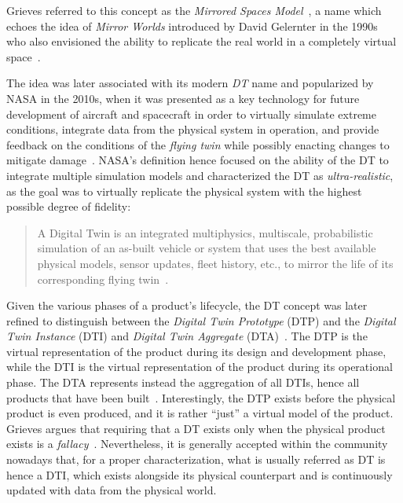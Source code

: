 Grieves referred to this concept as the \emph{Mirrored Spaces Model}~\cite{Grieves_2005},
a name which echoes the idea of \emph{Mirror Worlds} introduced by David Gelernter in the 1990s~\cite{gelernter1991mirrorworlds}
who also envisioned the ability to replicate the real world in a completely virtual space~\cite{Singh_Fuenmayor_Hinchy_Qiao_Murray_Devine_2021}.

The idea was later associated with its modern \emph{\acl{DT}} name and popularized by NASA in the 2010s, when it was presented as a key technology
for future development of aircraft and spacecraft in order to virtually simulate extreme conditions,
integrate data from the physical system in operation, 
and provide feedback on the conditions of the \emph{flying twin}
while possibly enacting changes to mitigate damage~\cite{glaessgen2012dtnasa}.
%
NASA's definition hence focused on the ability of the \ac{DT} to integrate multiple simulation models and characterized the \ac{DT} as \emph{ultra-realistic}, as the goal was to virtually replicate the physical system with the highest possible degree of fidelity:

\begin{quote}
    A Digital Twin is an integrated multiphysics, multiscale, probabilistic simulation of an as-built vehicle or system that uses the best available physical models, sensor updates, fleet history, etc., to mirror the life of its corresponding flying twin~\cite{glaessgen2012dtnasa}.
\end{quote}

Given the various phases of a product's lifecycle, the \ac{DT} concept was later
refined to distinguish between the \emph{Digital Twin Prototype} (DTP) and the \emph{Digital Twin Instance} (DTI) and \emph{Digital Twin Aggregate} (DTA)~\cite{Grieves2017}.
The DTP is the virtual representation of the product during its design and development phase,
while the DTI is the virtual representation of the product during its operational phase.
%
The DTA represents instead the aggregation of all DTIs, hence all products that have been built~\cite{Grieves_2022}.
%
Interestingly, the DTP exists before the physical product is even produced, 
and it is rather ``just'' a virtual model of the product. 
%
Grieves argues that requiring that a \ac{DT} exists only when the physical product exists is a \emph{fallacy}~\cite{Grieves_2022}.
%
Nevertheless, it is generally accepted within the community nowadays that, for a proper characterization, what is usually referred as \ac{DT} is hence a DTI, which exists alongside its physical counterpart and is continuously updated with data from the physical world. 

